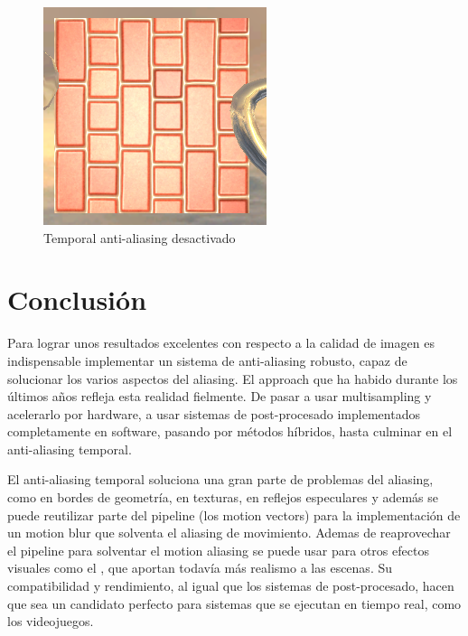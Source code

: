 \documentclass[withindex, glossary]{cam-thesis}
\begin{document}
\begin{figure}[!htbp]
    \includegraphics[width=.8\linewidth]{figures/sharpTAAOFFsmall.png}
    \caption{Temporal anti-aliasing desactivado}
    \label{sharpTAAOFFsmall}
\end{figure}

\chapter{Conclusión}

Para lograr unos resultados excelentes con respecto a la calidad de imagen es indispensable implementar un sistema de anti-aliasing robusto, capaz de solucionar los varios aspectos del aliasing. El approach que ha habido durante los últimos años refleja esta realidad fielmente. De pasar a usar multisampling y acelerarlo por hardware, a usar sistemas de post-procesado implementados completamente en software, pasando por métodos híbridos, hasta culminar en el anti-aliasing temporal.

El anti-aliasing temporal soluciona una gran parte de problemas del aliasing, como en bordes de geometría, en texturas, en reflejos especulares y además se puede reutilizar parte del pipeline (los motion vectors) para la implementación de un motion blur que solventa el aliasing de movimiento. Ademas de reaprovechar el pipeline para solventar el motion aliasing se puede usar para otros efectos visuales como el , que aportan todavía más realismo a las escenas. Su compatibilidad y rendimiento, al igual que los sistemas de post-procesado, hacen que sea un candidato perfecto para sistemas que se ejecutan en tiempo real, como los videojuegos.
\end{document}
